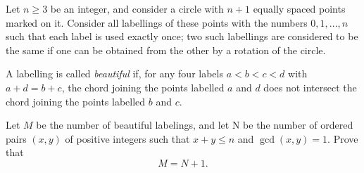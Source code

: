 Let $n \ge 3$ be an integer, and consider a circle with $n + 1$ equally spaced points marked on it. Consider all labellings of these points with the numbers $0, 1, ... , n$
 such that each label is used exactly once; two such labellings are 
considered to be the same if one can be obtained from the other by a 
rotation of the circle.

A labelling is called \emph{beautiful} if, for any four labels $a < b < c < d$ with $a + d = b + c$,  the chord joining the points labelled $a$ and $d$ does not intersect the chord joining the points labelled $b$ and $c$.

Let $M$ be the number of beautiful labelings, and let N be the number of ordered pairs $(x, y)$ of positive integers such that $x + y \le n$ and $\gcd(x, y) = 1$. Prove that $$M = N + 1.$$
